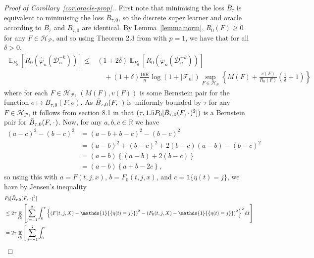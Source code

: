 \documentclass[numsec,webpdf,contemporary,medium,namedate]{oup-authoring-template}%
\theoremstyle{thmstyleone}%
\theoremstyle{thmstyletwo}%
\theoremstyle{thmstylethree}%
\DeclareMathOperator{\E}{\mathbb{E}} %
\newcommand{\R}{\mathbb{R}}
\newcommand{\blank}{\makebox[1ex]{\textbf{$\cdot$}}}
\renewcommand{\phi}{\varphi}
\newcommand*\diff{\mathop{}\!\mathrm{d}}
\newcommand{\1}{\mathds{1}}
\newcommand{\data}{\ensuremath{\mathcal{D}}}
\begin{document}
\begin{appendices}
\begin{proof}[Proof of Corollary~\ref{cor:oracle-prop}.]
  First note that minimising the loss \( \bar{B}_{\tau} \) is equivalent to
  minimising the loss \( \bar{B}_{\tau,0} \), so the discrete super learner and
  oracle according to \( \bar{B}_{\tau} \) and \( \bar{B}_{\tau,0} \) are
  identical. By Lemma~\ref{lemma:norm}, \( R_0(F) \geq 0 \) for any
  \( F \in \mathcal{H}_{\mathcal{P}} \), and so using Theorem 2.3 from \citep{vaart2006oracle} with
  \( p=1 \), we have that for all \( \delta >0 \),
\begin{align*}
  \E_{P_0}{\left[ R_0(\hat{\phi}_n(\data_n^{-k})) \right]}
  \leq
  &(1+2\delta)\E_{P_0}{\left[ R_0(\tilde{\phi}_n(\data_n^{-k})) \right]}
  \\
  & \quad + (1+\delta) \frac{16 K}{n}
    \log(1 + |\mathcal{F}_n|)\sup_{F \in \mathcal{H}_{\mathcal{P}}}
    \left\{
    M(F) + \frac{v(F)}{R_0(F)}
    \left(
    \frac{1}{\delta} + 1
    \right)
    \right\}
\end{align*}
where for each \( F \in \mathcal{H}_{\mathcal{P}} \), \( (M(F), v(F)) \) is some Bernstein pair for
the function \(o \mapsto \bar{B}_{\tau,0}(F, o) \). As
\( \bar{B}_{\tau,0}(F, \blank) \) is uniformly bounded by \( \tau \) for any
\( F \in \mathcal{H}_{\mathcal{P}} \), it follows from section 8.1 in \citep{vaart2006oracle} that
\( (\tau, 1.5 P_0{[\bar{B}_{\tau,0}(F, \blank)^2]}) \) is a Bernstein pair for
\( \bar{B}_{\tau,0}(F, \blank) \). Now, for any \( a,b,c \in \R \) we have
\begin{align*}
  (a-c)^2 - (b-c)^2
  & = (a-b+b-c)^2 - (b-c)^2
  \\
  & = (a-b)^2 + (b-c)^2 +2(b-c)(a-b) - (b-c)^2
  \\
  & = (a-b)
    \left\{
    (a-b) +  2(b-c)
    \right\}
  \\
  & = (a-b)
    \left\{
     a + b -2c
    \right\},
\end{align*}
so using this with \( a=F(t, j, x) \), \( b=F_0(t, j, x) \), and
\( c = \1{\{\eta(t) = j\}} \), we have by Jensen's inequality
\begin{align*}
  & P_0{[\bar{B}_{\tau,0}(F, \blank)^2]}
  \\
  & \leq
    2\tau\E_{P_0}{\left[
    \sum_{j=-1}^{2} \int_0^{\tau}
    \left\{
    \left(
    F(t, j, X) - \1{\{\eta(t) = j\}}
    \right)^2
    -
    \left(
    F_0(t, j, X) - \1{\{\eta(t) = j\}}
    \right)^2
    \right\}^2
    \diff t 
    \right]}
  \\
  & =2\tau
    \E_{P_0}\Bigg[
    \sum_{j=-1}^{2} \int_0^{\tau}

\end{align*}
\end{proof}
\end{appendices}
\end{document}
